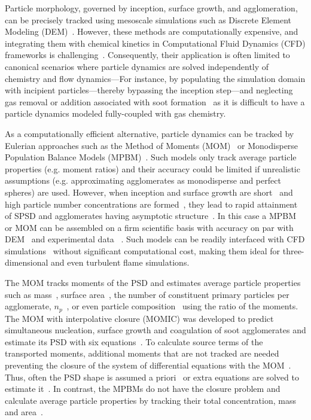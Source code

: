 Particle morphology, governed by inception, surface growth, and agglomeration, can be precisely tracked using mesoscale simulations such as Discrete Element Modeling (DEM)~\citep{Kelesidis2017Flame}. However, these methods are computationally expensive, and integrating them with chemical kinetics in Computational Fluid Dynamics (CFD) frameworks is challenging~\citep{kelesidis2021perspective}. Consequently, their application is often limited to canonical scenarios where particle dynamics are solved independently of chemistry and flow dynamics—For instance, by populating the simulation domain with incipient particles—thereby bypassing the inception step—and neglecting gas removal or addition associated with soot formation~\citep{Kelesidis2017} as it is difficult to have a particle dynamics modeled fully-coupled with gas chemistry. 

As a computationally efficient alternative, particle dynamics can be tracked by Eulerian approaches such as the Method of Moments (MOM)~\citep{kazakov1998dynamic} or Monodisperse Population Balance Models (MPBM)~\citep{kruis1993simple}. Such models only track average particle properties (e.g. moment ratios) and their accuracy could be limited if unrealistic assumptions (e.g. approximating agglomerates as monodisperse and perfect spheres) are used. However, when inception and surface growth are short~\citep{Spicer2002} and high particle number concentrations are formed~\cite{Kelesidis2017}, they lead to rapid attainment of SPSD and agglomerates having asymptotic structure~\citep{Goudeli2016}. In this case a MPBM or MOM can be assembled on a firm scientific basis with accuracy on par with DEM~\citep{Kelesidis2017Flame} and experimental data ~\citep{abid2008evolution, ma2013soot, camacho2015mobility}. Such models can be readily interfaced with CFD simulations~\citep{grohn2012fluid} without significant computational cost, making them ideal for three-dimensional and even turbulent flame simulations. 

The MOM tracks moments of the PSD and estimates average particle properties such as mass~\citep{pratsinis1988simultaneous}, surface area~\citep{blanquart2009joint}, the number of constituent primary particles per agglomerate, ${n_p}$~\citep{kazakov1998dynamic}, or even particle composition~\citep{blanquart2009analyzing} using the ratio of the moments. The MOM with interpolative closure (MOMIC) was developed to predict simultaneous nucleation, surface growth and coagulation of soot agglomerates and estimate its PSD with six equations~\citep{kazakov1998dynamic}. To calculate source terms of the transported moments, additional moments that are not tracked are needed preventing the closure of the system of differential equations with the MOM~\citep{pratsinis1988simultaneous, frenklach1987aerosol}. Thus, often the PSD shape is assumed a priori~\citep{pratsinis1988simultaneous} or extra equations are solved to estimate it~\citep{kruis1993simple}. In contrast, the MPBMs do not have the closure problem and calculate average particle properties by tracking their total concentration, mass \citep{kruis1993simple} and area~\citep{tsantilis2004soft, lindstedt1994simplified}. 

